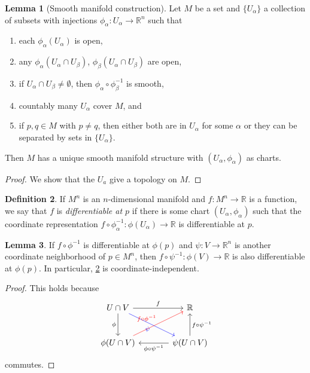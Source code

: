 \documentclass[10pt,letterpaper,cm]{nupset}
\theoremstyle{definition}
\newtheorem{definition}{Definition}[subsection]
\theoremstyle{theorem}
\newtheorem{lemma}[definition]{Lemma}
\theoremstyle{remark}
\newcommand{\R}{\mathbb R}
\newcommand{\1}{\mathbf{1}}
\newcommand{\0}{\vec 0}
\begin{document}
\begin{lemma}[Smooth manifold construction]\label{smc}
Let $M$ be a set and $\{U_\alpha\}$ a collection of subsets with injections $\phi_\alpha : U_\alpha \to \R^n$ such that
\begin{enumerate}
\item each $\phi_\alpha(U_\alpha)$ is open,
\item any $\phi_\alpha(U_\alpha \cap U_\beta)$, $\phi_\beta(U_\alpha \cap U_\beta)$ are open,
\item if $U_\alpha \cap U_\beta \ne \emptyset$, then $\phi_\alpha \circ \phi_\beta^{-1}$ is smooth, 
\item countably many $U_\alpha$ cover $M$, and
\item if $p, q\in M$ with $p\ne q$, then either both are in $U_\alpha$ for some $\alpha$ or they can be separated by sets in $\{U_\alpha\}$.
\end{enumerate}

Then $M$ has a unique smooth manifold structure with $\left(U_\alpha, \phi_\alpha\right)$ as charts. 
\end{lemma}

\begin{proof}
We show that the $U_a$ give a topology on $M$.
\end{proof}

\begin{definition}\label{d1}
If $M^n$ is an $n$-dimensional manifold and $f: M^n \to \R$ is a function, we say that $f$ is \textit{differentiable at $p$} if there is some chart $(U_\alpha, \phi_\alpha)$ such that the coordinate representation $f\circ \phi_\alpha^{-1}: \phi(U_\alpha) \to \R$ is differentiable at $p$.
\end{definition}

\begin{lemma}
If $f \circ \phi^{-1}$ is differentiable at $\phi(p)$ and $\psi: V \to \R^n$ is another coordinate neighborhood of $p\in M^n$, then $f \circ \psi^{-1}: \phi(V) \to \R$ is also differentiable at $\phi(p)$. In particular, \cref{d1} is coordinate-independent. 
\end{lemma}
\begin{proof}
This holds because
\[ \begin{tikzcd}[row sep=large, column sep=large]
U \cap V \arrow[to=Z, "\phi", swap] \arrow[to=2-2, dr, blue, "\psi", swap]
& \R \\
|[alias=Z]| \phi(U \cap V) \arrow[to=1-2, ur, red, "f\circ \phi^{-1}"] 
& \psi(U \cap V)
\arrow[from=ul, to=1-2, "f"] \arrow[to=Z, "\phi \circ \psi^{-1}"] \arrow[to=1-2, "f \circ \psi^{-1}", swap] 
\end{tikzcd}
\]
commutes.
\end{proof}
\end{document}
